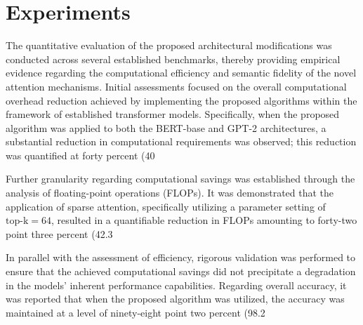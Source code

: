 \documentclass[12pt]{article}
\begin{document}
\section{Experiments}
The quantitative evaluation of the proposed architectural modifications was conducted across several established benchmarks, thereby providing empirical evidence regarding the computational efficiency and semantic fidelity of the novel attention mechanisms. Initial assessments focused on the overall computational overhead reduction achieved by implementing the proposed algorithms within the framework of established transformer models. Specifically, when the proposed algorithm was applied to both the BERT-base and GPT-2 architectures, a substantial reduction in computational requirements was observed; this reduction was quantified at forty percent (40%

Further granularity regarding computational savings was established through the analysis of floating-point operations (FLOPs). It was demonstrated that the application of sparse attention, specifically utilizing a parameter setting of $\text{top-k}=64$, resulted in a quantifiable reduction in FLOPs amounting to forty-two point three percent (42.3%

In parallel with the assessment of efficiency, rigorous validation was performed to ensure that the achieved computational savings did not precipitate a degradation in the models' inherent performance capabilities. Regarding overall accuracy, it was reported that when the proposed algorithm was utilized, the accuracy was maintained at a level of ninety-eight point two percent (98.2%
\end{document}
